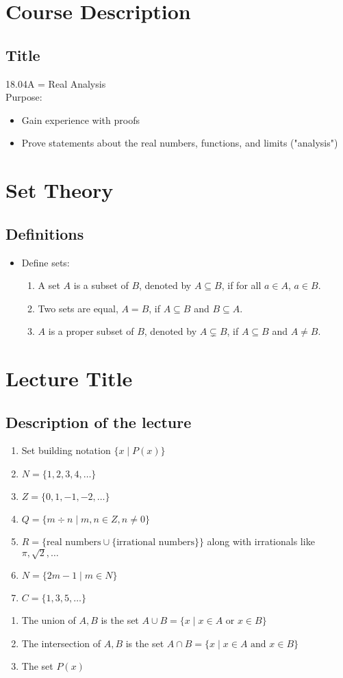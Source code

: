 \documentclass{article}
\begin{document}
\section{Course Description}
\subsection{Title}
18.04A = Real Analysis \\
Purpose: 
\begin{itemize}
    \item Gain experience with proofs
    \item Prove statements about the real numbers, functions, and limits ("analysis")
\end{itemize}

\section{Set Theory}
\subsection{Definitions}
\begin{itemize}
    \item Define sets:
        \begin{enumerate}
            \item A set $A$ is a subset of $B$, denoted by $A \subseteq B$, if for all $a \in A$, $a \in B$.
            \item Two sets are equal, $A = B$, if $A \subseteq B$ and $B \subseteq A$.
            \item $A$ is a proper subset of $B$, denoted by $A \subsetneq B$, if $A \subseteq B$ and $A \neq B$.
        \end{enumerate}
\end{itemize}

\section*{Lecture Title}
\subsection*{Description of the lecture}

\begin{enumerate}
\item Set building notation $\{ x \mid P(x) \}$
\item $N=\{1,2,3,4,\ldots\}$
\item $Z=\{0,1,-1,-2,\ldots\}$
\item $Q=\{m \div n \mid m,n \in Z, n \neq 0\}$
\item $R = \{\text{real numbers} \cup \{\text{irrational numbers}\} \}$ along with irrationals like $\pi, \sqrt{2}, \ldots$
\item $N=\{2m-1 \mid m \in N\}$
\item $C=\{1,3,5,\ldots\}$
\end{enumerate}

\begin{enumerate}
\item The union of $A,B$ is the set $A \cup B = \{x \mid x \in A \text{ or } x \in B\}$
\item The intersection of $A,B$ is the set $A \cap B = \{x \mid x \in A \text{ and } x \in B\}$
\item The set $P(x)$
\end{enumerate}
\end{document}

